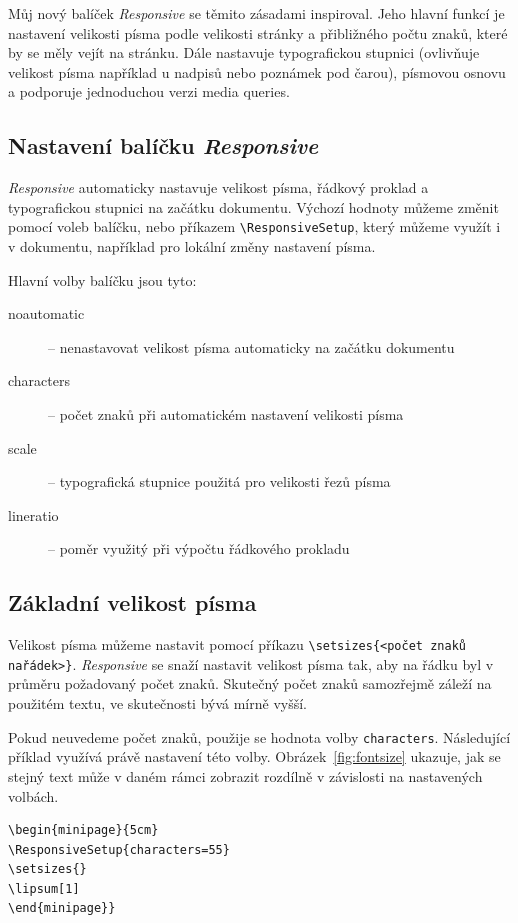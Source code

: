 \documentclass{csbulletin}
\newcommand\balicek[1]{\textit{#1}}
\begin{document}
Můj nový balíček \balicek{Responsive} se těmito zásadami inspiroval. 
Jeho hlavní funkcí je nastavení velikosti písma podle velikosti stránky
a přibližného počtu znaků, které by se měly vejít na stránku. 
Dále nastavuje typografickou stupnici (ovlivňuje velikost písma například 
u nadpisů nebo poznámek pod čarou), písmovou osnovu a podporuje
jednoduchou verzi media queries.

\subsection{Nastavení balíčku \balicek{Responsive}}

\balicek{Responsive} automaticky nastavuje velikost písma, řádkový proklad
a typografickou stupnici na začátku dokumentu. Výchozí hodnoty můžeme změnit
pomocí voleb balíčku, nebo příkazem \verb|\ResponsiveSetup|, který můžeme 
využít i v dokumentu, například pro lokální změny nastavení písma. 

Hlavní volby balíčku jsou tyto:

\begin{description}
  \item[noautomatic] – nenastavovat velikost písma automaticky na začátku dokumentu
  \item[characters] – počet znaků při automatickém nastavení velikosti písma
  \item[scale] –  typografická stupnice použitá pro velikosti řezů písma
  \item[lineratio] – poměr využitý při výpočtu řádkového prokladu
\end{description}

\subsection{Základní velikost písma}

Velikost písma můžeme nastavit pomocí příkazu \verb|\setsizes{<počet znaků na|\allowbreak\verb|řádek>}|. 
\balicek{Responsive} se snaží nastavit velikost písma tak, aby na řádku byl v průměru
požadovaný počet znaků. Skutečný počet znaků samozřejmě záleží na použitém textu, ve 
skutečnosti bývá mírně vyšší.

Pokud neuvedeme počet znaků, použije se hodnota volby \texttt{characters}.
Následující příklad využívá právě nastavení této volby. Obrázek~\ref{fig:fontsize} 
ukazuje, jak se stejný text může v daném rámci zobrazit rozdílně v závislosti na
nastavených volbách.

\begin{verbatim}
\begin{minipage}{5cm}
\ResponsiveSetup{characters=55}
\setsizes{}
\lipsum[1]
\end{minipage}}
\end{verbatim}
\end{document}

